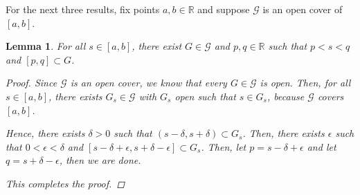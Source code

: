 \documentclass[11pt]{article}
\newcommand{\bbR}{\mathbb{R}}
\renewcommand{\_}[1]{\underline{ #1 }}
\newtheorem{lemma}[theorem]{Lemma}
\theoremstyle{definition}
\numberwithin{equation}{subsection}
\begin{document}
\newcommand\cG{\mathcal G}

For the next three results, fix points $a,b\in \bbR$ and suppose $\cG$ is an open cover of $[a,b]$.

\begin{lemma}
\label{lem2}
For all $s\in[a,b]$, there exist $G\in\cG$ and $p,q\in \bbR$ such that $p<s<q$ and $[p,q]\subset G$.

\begin{proof}
Since $\cG$ is an open cover, we know that every $G \in \cG$ is open. Then, for all $s \in [a,b]$, there exists $G_s \in \cG$ with $G_s$ open such that $s \in G_s$, because $\cG$ covers $[a,b]$.  

Hence, there exists $\delta >0$ such that $(s-\delta, s+\delta) \subset G_s$. Then, there exists $\epsilon$ such that $0<\epsilon<\delta$ and $[s-\delta+\epsilon, s+\delta-\epsilon] \subset G_s$. Then, let $p = s-\delta+\epsilon$ and let $q = s+\delta-\epsilon$, then we are done.

This completes the proof.


\renewcommand\qedsymbol{QED}
\end{proof}


\end{lemma}
\end{document}
